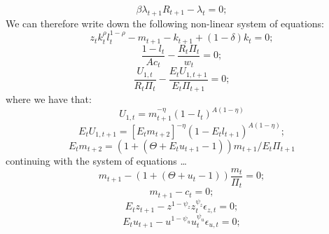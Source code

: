 \documentclass[a4paper,11pt]{article}
\begin{document}
\[\beta\lambda_{t+1}R_{t+1}-\lambda_t = 0;\]
We can therefore write down the following non-linear system of equations:
\begin{equation}
z_tk_t^{\rho}l_t^{1-\rho}-m_{t+1}-k_{t+1}+\left(1-\delta\right)k_t = 0;
\end{equation}
\begin{equation}
\frac{1-l_t}{Ac_t}-\frac{R_t\Pi_t}{w_t} = 0;
\end{equation}
\begin{equation}
\frac{U_{1,t}}{R_t\Pi_t}-\frac{E_tU_{1,t+1}}{E_t\Pi_{t+1}} = 0;
\end{equation}
where we have that:
\[U_{1,t} = m_{t+1}^{-\eta}\left(1-l_t\right)^{A\left(1-\eta\right)}\]
\[E_tU_{1,t+1} = \left[E_tm_{t+2}\right]^{-\eta}\left(1-E_tl_{t+1}\right)^{A\left(1-\eta\right)};\]
\[E_tm_{t+2} = \left(1+\left(\Theta+E_tu_{t+1}-1\right)\right)m_{t+1}/E_t\Pi_{t+1} \]
continuing with the system of equations \ldots
\begin{equation}
m_{t+1}-\left(1+\left(\Theta+u_t-1\right)\right)\frac{m_t}{\Pi_t} = 0;
\end{equation}
\begin{equation}
m_{t+1}-c_t = 0;
\end{equation}
\begin{equation}
E_tz_{t+1}-z^{1-\psi_z}z_t^{\psi_z}\epsilon_{z,t} = 0;
\end{equation}
\begin{equation}
E_tu_{t+1}-u^{1-\psi_u}u_t^{\psi_u}\epsilon_{u,t} = 0;
\end{equation}
\end{document}
